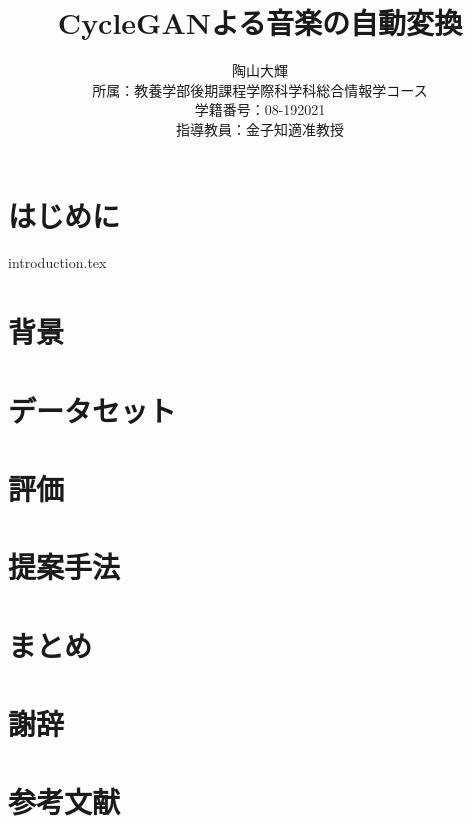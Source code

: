 \documentclass[dvipdfmx]{jarticle}
\title{CycleGANよる音楽の自動変換}
\author{陶山大輝 \\
所属：教養学部後期課程学際科学科総合情報学コース\\
学籍番号：08-192021\\
指導教員：金子知適准教授\\}
\begin{document}
\maketitle

\newpage

\begin{abstract}


\end{abstract}

\tableofcontents

\newpage

\part{はじめに}
{introduction.tex}

\part{背景}


\part{データセット}


\part{評価}


\part{提案手法}


\part{まとめ}


\part{謝辞}

\part{参考文献}



\end{document}
